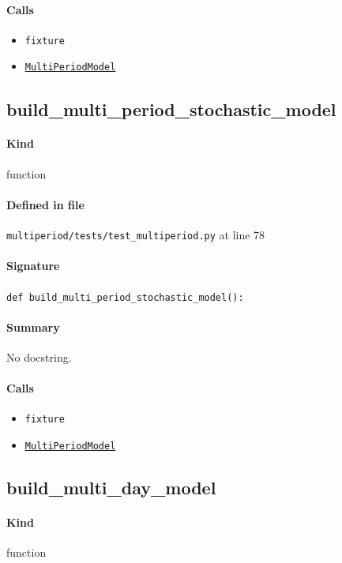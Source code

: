 \documentclass[11pt]{report}
\begin{document}
\paragraph{Calls}
\begin{itemize}[leftmargin=*]
  \item \texttt{fixture}
  \item \hyperref[def:multiperiod-multiperiod.py:MultiPeriodModel:L24]{\texttt{MultiPeriodModel}}
\end{itemize}
\subsection{build\_multi\_period\_stochastic\_model}
\label{def:multiperiod-tests-test_multiperiod.py:build_multi_period_stochastic_model:L78}
\paragraph{Kind} function
\paragraph{Defined in file} \texttt{multiperiod/tests/test\_multiperiod.py} at line 78
\paragraph{Signature} \texttt{def build\_multi\_period\_stochastic\_model():}
\paragraph{Summary} No docstring.
\paragraph{Calls}
\begin{itemize}[leftmargin=*]
  \item \texttt{fixture}
  \item \hyperref[def:multiperiod-multiperiod.py:MultiPeriodModel:L24]{\texttt{MultiPeriodModel}}
\end{itemize}
\subsection{build\_multi\_day\_model}
\label{def:multiperiod-tests-test_multiperiod.py:build_multi_day_model:L93}
\paragraph{Kind} function
\end{document}
